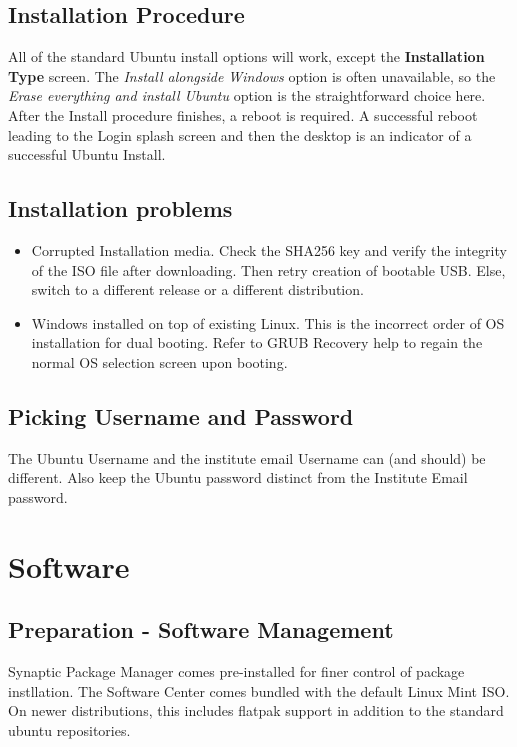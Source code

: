\documentclass[8pt,letterpaper,twocolumn]{article}
\begin{document}
\subsection{Installation Procedure}
All of the standard Ubuntu install options will work, except the \textbf{Installation Type} screen. 
The \textit{Install alongside Windows} option is often unavailable, so the \textit{Erase everything and install Ubuntu} 
option is the straightforward choice here. 
After the Install procedure finishes, a reboot is required. 
A successful reboot leading to the Login splash screen and then the desktop is an indicator of a successful Ubuntu Install.

\subsection{Installation problems}

\begin{itemize}
	\item Corrupted Installation media. Check the SHA256 key and verify the integrity of the ISO file after downloading. 
	Then retry creation of bootable USB. Else, switch to a different release or a different distribution.
	\item Windows installed on top of existing Linux. 
	This is the incorrect order of OS installation for dual booting. 
	Refer to GRUB Recovery help to regain the normal OS selection screen upon booting.
\end{itemize}

\subsection{Picking Username and Password}
The Ubuntu Username and the institute email Username can (and should) be different. 
Also keep the Ubuntu password distinct from the Institute Email password.

\newpage

\section{Software}
\subsection{Preparation - Software Management}

Synaptic Package Manager comes pre-installed for finer control of package instllation. 
The Software Center comes bundled with the default Linux Mint ISO. 
On newer distributions, this includes flatpak support in addition to the standard ubuntu repositories. \\
\end{document}
